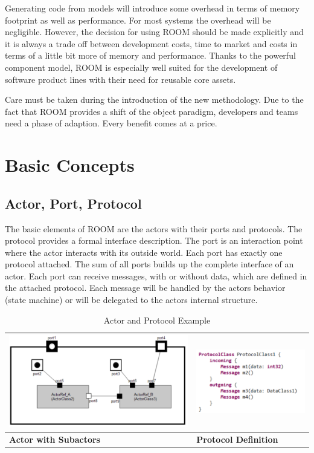 Generating code from models will introduce some overhead in terms of memory footprint as well as performance. For most systems the overhead will be negligible. However, the decision for using ROOM should be made explicitly and it is always a trade off between development costs, time to market and costs in terms of a little bit more of memory and performance. Thanks to the powerful component model, ROOM is especially well suited for the development of software product lines with their need for reusable core assets.  
  
Care must be taken during the introduction of the new methodology. Due to the fact that ROOM provides a shift of the object paradigm, developers and teams need a phase of adaption. Every benefit comes at a price.

\section{Basic Concepts}

\subsection{Actor, Port, Protocol}

The basic elements of ROOM are the actors with their ports and protocols. The protocol provides a formal interface description. The port is an interaction point where the actor interacts with its outside world. Each port has exactly one protocol attached. The sum of all ports builds up the complete interface of an actor. Each port can receive messages, with or without data, which are defined in the attached protocol. Each message will be handled by the actors behavior (state machine) or will be delegated to the actors internal structure.

\begin{table}
\caption{Actor and Protocol Example}
\begin{tabular}{|l|l|}
\hline
\includegraphics[scale=0.85]{images/040-ActorClass.png} & \includegraphics[scale=0.85]{images/040-ProtocolClassTextualNotation.png} \\ \hline
\textbf{Actor with Subactors} & \textbf{Protocol Definition} \\ \hline
\end{tabular}
\end{table}

